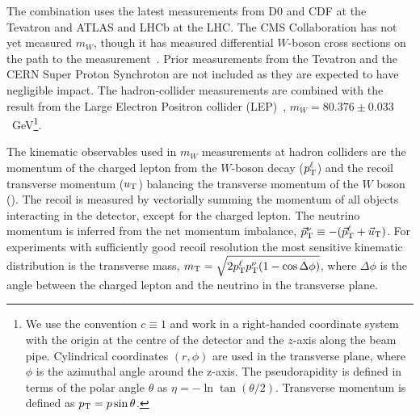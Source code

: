 
The combination uses the latest measurements from D0 and CDF at the Tevatron and ATLAS and LHCb at the LHC.
The CMS Collaboration has not yet measured $m_W$, though it has measured differential $W$-boson cross sections
on the path to the measurement~\cite{CMSW}.
Prior measurements from the Tevatron and the CERN Super Proton Synchroton are not included as they are expected
to have negligible impact.  
The hadron-collider measurements are combined with
the result from the Large Electron Positron collider (LEP)~\cite{ALEPH:2013dgf},
$m_W = 80.376 \pm 0.033$~GeV\footnote{We use the convention $c \equiv 1$ and work in a right-handed coordinate system
with the origin at the centre of the detector and the $z$-axis along the beam pipe.  Cylindrical coordinates $(r,\phi)$
are used in the transverse plane, where $\phi$ is the azimuthal angle around the z-axis.  The pseudorapidity is defined
in terms of the polar angle $\theta$ as $\eta = -\ln\tan(\theta/2)$.  Transverse momentum is defined as $p_{\scriptsize\textrm{T}} = p\sin\theta$.
}.

The kinematic observables used in $m_W$ measurements at hadron colliders are the momentum of the charged lepton from
the $W$-boson decay ($p^{\ell}_{\scriptsize\textrm{T}}$) and the recoil transverse momentum ($u_{\scriptsize\mathrm{T}}$)
balancing the transverse momentum of the $W$ boson (\pTW).  The recoil is measured by vectorially summing the momentum of
all objects interacting in the detector, except for the charged lepton.  The neutrino momentum is inferred from the
net momentum imbalance,
$\vec{p}^{\nu}_{\scriptsize\mathrm{T}} \equiv -(\vec{p}^{\ell}_{\scriptsize\mathrm{T}} + \vec{u}_{\scriptsize\mathrm{T}})$.
For experiments with sufficiently good recoil resolution the most sensitive kinematic distribution is the transverse mass,
$m_{\scriptsize\textrm{T}} = \sqrt{2p_{\scriptsize\textrm{T}}^{\ell} p_{\scriptsize\textrm{T}}^\nu (1-\cos\Delta\phi)}$,
where $\Delta \phi$ is the angle between the charged lepton and the neutrino in the transverse plane.  

